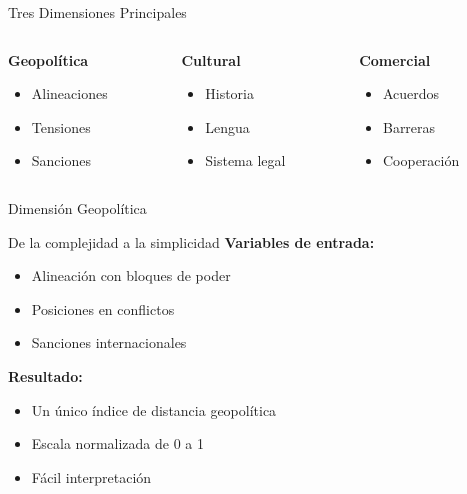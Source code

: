 \documentclass{beamer}
\begin{document}
\begin{frame}{Tres Dimensiones Principales}
    \begin{columns}[t]
        \begin{column}{0.32\textwidth}
            \textbf{Geopolítica}
            \centering
            \begin{itemize}
                \item Alineaciones
                \item Tensiones
                \item Sanciones
            \end{itemize}
        \end{column}
        \begin{column}{0.32\textwidth}
            \textbf{Cultural}
            \centering
            \begin{itemize}
                \item Historia
                \item Lengua
                \item Sistema legal
            \end{itemize}
        \end{column}
        \begin{column}{0.32\textwidth}
            \textbf{Comercial}
            \centering
            \begin{itemize}
                \item Acuerdos
                \item Barreras
                \item Cooperación
            \end{itemize}
        \end{column}
    \end{columns}
\end{frame}

\begin{frame}{Dimensión Geopolítica}
    \begin{block}{De la complejidad a la simplicidad}
        \textbf{Variables de entrada:}
        \begin{itemize}
            \item Alineación con bloques de poder
            \item Posiciones en conflictos
            \item Sanciones internacionales
        \end{itemize}
        
        \textbf{Resultado:}
        \begin{itemize}
            \item Un único índice de distancia geopolítica
            \item Escala normalizada de 0 a 1
            \item Fácil interpretación
        \end{itemize}
    \end{block}
\end{frame}
\end{document}
